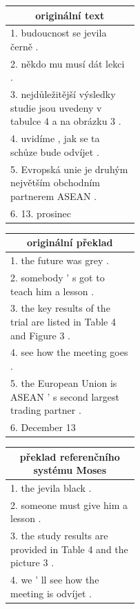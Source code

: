 \begin{figure}[H]
    \begin{center}
        \begin{tabular}{|p{0.44\linewidth}|}
          \hline
          \multicolumn{1}{|c|}{originální text} \\
          \hline
          1. budoucnost se jevila černě . \\
          2. někdo mu musí dát lekci . \\
          3. nejdůležitější výsledky studie jsou uvedeny v tabulce 4 a na obrázku 3 . \\
          4. uvidíme , jak se ta schůze bude odvíjet . \\
          5. Evropská unie je druhým největším obchodním partnerem ASEAN . \\
          6. 13. prosinec \\
          \hline
        \end{tabular}
        \hspace{5mm}
        \begin{tabular}{|p{0.44\linewidth}|}
          \hline
          \multicolumn{1}{|c|}{originální překlad} \\
          \hline
          1. the future was grey . \\
          2. somebody '  s got to teach him a lesson . \\
          3. the key results of the trial are listed in Table 4 and Figure 3 . \\
          4. see how the meeting goes . \\
          5. the European Union is ASEAN '  s second largest trading partner . \\
          6. December 13 \\
          \hline
        \end{tabular}
    \end{center}
    \begin{center}
        \begin{tabular}{|p{0.44\linewidth}|}
          \hline
          \multicolumn{1}{|c|}{překlad referenčního systému Moses} \\
          \hline
          1. the jevila black .  \\
          2. someone must give him a lesson .  \\
          3. the study results are provided in Table 4 and the picture 3 . \\
          4. we ' ll see how the meeting is odvíjet . \\

\end{tabular}
\end{center}
\end{figure}
